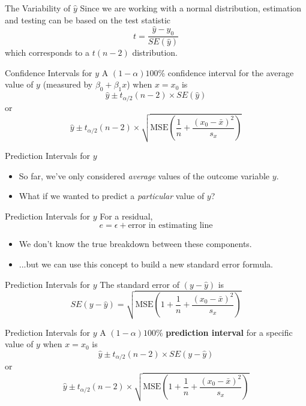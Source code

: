 \begin{frame}{The Variability of $\hat{y}$}
    Since we are working with a normal distribution, estimation and testing can be based on the test statistic
    \[
        t = \frac{\hat{y} - y_0}{SE(\hat{y})}
    \]
    which corresponds to a $t(n-2)$ distribution.
\end{frame}

\begin{frame}{Confidence Intervals for $y$}
    A $(1-\alpha)100$\% confidence interval for the average value of $y$ (measured by $\beta_0 + \beta_1 x$) when $x=x_0$ is
    \[
        \hat{y} \pm t_{\alpha/2}(n-2)\times SE(\hat{y}) 
    \]
    or
    \[
        \hat{y} \pm t_{\alpha/2}(n-2)\times 
        \sqrt{\text{MSE}\left(\frac{1}{n} + \frac{(x_0-\bar{x})^2}{s_x}\right)}
    \]
\end{frame}

\begin{frame}{Prediction Intervals for $y$}
    \begin{itemize}
        \item So far, we've only considered \textit{average} values of the outcome variable $y$.
        \item What if we wanted to predict a \textit{particular} value of $y$?
    \end{itemize}
\end{frame}

\begin{frame}{Prediction Intervals for $y$}
    For a residual,
    \[
        e = \epsilon + \text{error in estimating line}
    \]
    \begin{itemize}
        \item We don't know the true breakdown between these components.
        \item ...but we can use this concept to build a new standard error formula.
    \end{itemize}
\end{frame}

\begin{frame}{Prediction Intervals for $y$}
    The standard error of $(y-\hat{y})$ is
    \[
        SE(y-\hat{y}) = \sqrt{\text{MSE}\left(1 + \frac{1}{n} + \frac{(x_0-\bar{x})^2}{s_x}\right)}
    \]
\end{frame}

\begin{frame}{Prediction Intervals for $y$}
    A $(1-\alpha)100$\% \textbf{prediction interval} for a specific value of $y$ when $x=x_0$ is
    \[
        \hat{y} \pm t_{\alpha/2}(n-2)\times SE(y-\hat{y}) 
    \]
    or
    \[
        \hat{y} \pm t_{\alpha/2}(n-2)\times 
        \sqrt{\text{MSE}\left(1 + \frac{1}{n} + \frac{(x_0-\bar{x})^2}{s_x}\right)}
    \]
\end{frame}

